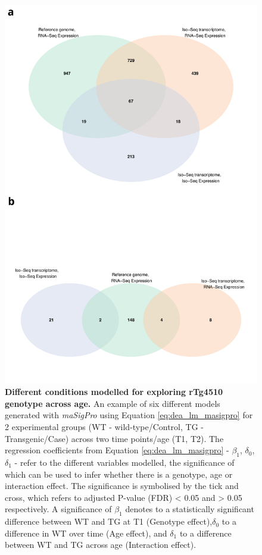 \begin{figure}[!htp]
	\centering
	\includegraphics[page=2,trim={0 5cm 0 4cm},scale = 0.45]{Figures/WholeDifferentialAnalysis.pdf}
	\captionsetup{width=0.95\textwidth}
	\caption[Different conditions modelled for exploring rTg4510 genotype across age]%
	{\textbf{Different conditions modelled for exploring rTg4510 genotype across age.} An example of six different models generated with \textit{maSigPro} using Equation \cref{eq:dea_lm_masigpro} for 2 experimental groups (WT - wild-type/Control, TG - Transgenic/Case) across two time points/age (T1, T2). The regression coefficients from Equation \cref{eq:dea_lm_masigpro} - $\beta_{1}$, $\delta_{0}$, $\delta_{1}$ - refer to the different variables modelled, the significance of which can be used to infer whether there is a genotype, age or interaction effect. The significance is symbolised by the tick and cross, which refers to adjusted P-value (FDR) < 0.05 and > 0.05 respectively. A significance of  $\beta_{1}$ denotes to a statistically significant difference between WT and TG at T1 (Genotype effect),$\delta_{0}$ to a difference in WT over time (Age effect), and $\delta_{1}$ to a difference between WT and TG across age (Interaction effect). \\\\
}
\end{figure}
